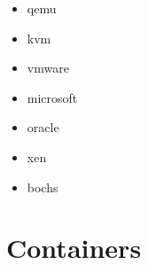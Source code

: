 \begin{questions}

  \question
\begin{itemize}  
\item qemu
\item kvm
\item vmware
\item microsoft
\item oracle
\item xen
\item bochs
  \end{itemize}
\end{questions}

\section{Containers}


